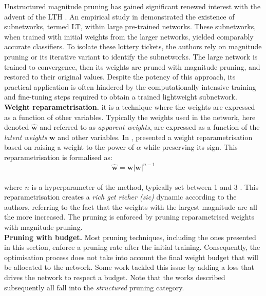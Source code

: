 Unstructured magnitude pruning has gained significant renewed interest with the
advent of the \acf{LTH} \cite{DBLP:conf/iclr/FrankleC19}. An empirical study in
\cite{DBLP:conf/iclr/FrankleC19} demonstrated the existence of subnetworks,
termed \acf{LT}, within large pre-trained networks. These subnetworks, when
trained with initial weights from the larger networks, yielded comparably
accurate classifiers. To isolate these lottery tickets, the authors rely on
magnitude pruning or its iterative variant to identify the subnetworks. The
large network is trained to convergence, then its weights are pruned with
magnitude pruning, and restored to their original values. Despite the potency of
this approach, its practical application is often hindered by the
computationally intensive training and fine-tuning steps required to obtain a
trained lightweight subnetwork.\\


\noindent \textbf{Weight reparametrisation.} it is a
technique where the weights are expressed as a function of other variables.
Typically the weights used in the network, here denoted $\mathbf{\hat{w}}$ and
referred to as \emph{apparent weights}, are expressed as a function of the
\emph{latent weights} $\mathbf{w}$ and other variables. In \cite{powerprop},
\citeauthor{powerprop} presented a weight reparametrisation based on raising a
weight to the power of $\alpha$ while preserving its sign. This
reparametrisation is formalised as: \\

\begin{equation}
  \label{eqn:chap1:power_propagation}
  \mathbf{\hat{w}} = \mathbf{w} |\mathbf{w}|^{n-1}
\end{equation}\\

\noindent where $n$ is a hyperparameter of the method, typically set
between 1 and 3 \cite{powerprop}. This reparametrisation
creates a \emph{rich get richer (sic)} dynamic according to the authors,
referring to the fact that the weights with the largest magnitude are all the
more increased. The pruning is enforced by pruning reparametrised weights with
magnitude pruning.\\


\noindent \textbf{Pruning with budget.} Most pruning techniques, including the
ones presented in this section, enforce a pruning rate after the initial
training. Consequently, the optimisation process does not take into account the
final weight budget that will be allocated to the network. Some work tackled
this issue by adding a loss that drives the network to respect a budget. Note
that the works described subsequently all fall into the \emph{structured}
pruning category.\\ 

